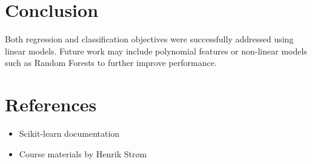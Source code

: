 \documentclass[10pt]{article}
\begin{document}
\section{Conclusion}
Both regression and classification objectives were successfully addressed using linear models. Future work may include polynomial features or non-linear models such as Random Forests to further improve performance.

\section*{References}
\begin{itemize}
    \item Scikit-learn documentation
    \item Course materials by Henrik Strøm
\end{itemize}
\end{document}
